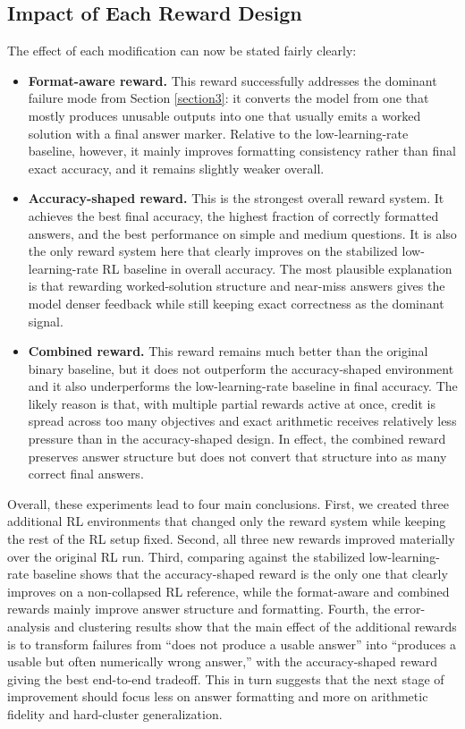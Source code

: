 \documentclass[a4paper,12pt]{article}
\begin{document}
\subsection{Impact of Each Reward Design}

The effect of each modification can now be stated fairly clearly:

\begin{itemize}
    \item \textbf{Format-aware reward.} This reward successfully addresses the dominant failure mode from Section \ref{section3}: it converts the model from one that mostly produces unusable outputs into one that usually emits a worked solution with a final answer marker. Relative to the low-learning-rate baseline, however, it mainly improves formatting consistency rather than final exact accuracy, and it remains slightly weaker overall.
    \item \textbf{Accuracy-shaped reward.} This is the strongest overall reward system. It achieves the best final accuracy, the highest fraction of correctly formatted answers, and the best performance on simple and medium questions. It is also the only reward system here that clearly improves on the stabilized low-learning-rate RL baseline in overall accuracy. The most plausible explanation is that rewarding worked-solution structure and near-miss answers gives the model denser feedback while still keeping exact correctness as the dominant signal.
    \item \textbf{Combined reward.} This reward remains much better than the original binary baseline, but it does not outperform the accuracy-shaped environment and it also underperforms the low-learning-rate baseline in final accuracy. The likely reason is that, with multiple partial rewards active at once, credit is spread across too many objectives and exact arithmetic receives relatively less pressure than in the accuracy-shaped design. In effect, the combined reward preserves answer structure but does not convert that structure into as many correct final answers.
\end{itemize}

Overall, these experiments lead to four main conclusions. First, we created three additional RL environments that changed only the reward system while keeping the rest of the RL setup fixed. Second, all three new rewards improved materially over the original RL run. Third, comparing against the stabilized low-learning-rate baseline shows that the accuracy-shaped reward is the only one that clearly improves on a non-collapsed RL reference, while the format-aware and combined rewards mainly improve answer structure and formatting. Fourth, the error-analysis and clustering results show that the main effect of the additional rewards is to transform failures from ``does not produce a usable answer'' into ``produces a usable but often numerically wrong answer,'' with the accuracy-shaped reward giving the best end-to-end tradeoff. This in turn suggests that the next stage of improvement should focus less on answer formatting and more on arithmetic fidelity and hard-cluster generalization.\\
\end{document}
